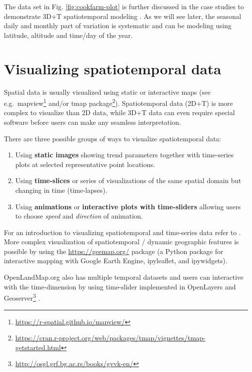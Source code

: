 \documentclass[
  graybox,natbib,nospthms]{svmono}
\providecommand{\tightlist}{%
  \setlength{\itemsep}{0pt}\setlength{\parskip}{0pt}}
\providecommand{\tightlist}{\setlength{\itemsep}{0pt}\setlength{\parskip}{0pt}}
\renewcommand{\href}[2]{#2 (\url{#1})}
\renewcommand{\href}[2]{#2\footnote{\url{#1}}}
\begin{document}
The data set in Fig. \ref{fig:cookfarm-plot} is further discussed in the case
studies to demonstrate 3D+T spatiotemporal modeling \citep{gasch2015spatio}.
As we will see later, the seasonal daily and monthly part of variation
is systematic and can be modeling using latitude, altitude and time/day of the year.

\hypertarget{visualizing-spatiotemporal-data}{%
\section{Visualizing spatiotemporal data}\label{visualizing-spatiotemporal-data}}

Spatial data is usually visualized using static or interactive maps (see e.g.~\href{https://r-spatial.github.io/mapview/}{mapview} and/or \href{https://cran.r-project.org/web/packages/tmap/vignettes/tmap-getstarted.html}{tmap package}).
Spatiotemporal data (2D+T) is more complex to visualize than 2D data, while 3D+T data
can even require special software \citep{hengl2015plotkml} before
users can make any seamless interpretation.

There are three possible groups of ways to visualize spatiotemporal
data:

\begin{enumerate}
\def\labelenumi{\arabic{enumi}.}
\tightlist
\item
  Using \textbf{static images} showing trend parameters together with
  time-series plots at selected representative point locations.\\
\item
  Using \textbf{time-slices} or series of visualizations of the same
  spatial domain but changing in time (time-lapses).\\
\item
  Using \textbf{animations} or \textbf{interactive plots with time-sliders}
  allowing users to choose \emph{speed} and \emph{direction} of animation.
\end{enumerate}

For an introduction to visualizing spatiotemporal and time-series data
refer to \citet{lamigueiro2014displaying}. More complex visualization of
spatiotemporal / dynamic geographic features is possible by using the
\url{https://geemap.org/} package (a Python package for interactive mapping with Google Earth Engine, ipyleaflet, and ipywidgets).

OpenLandMap.org also has multiple temporal datasets and users can interactive with
the time-dimension by using time-slider implemented in \href{http://osgl.grf.bg.ac.rs/books/gvvk-en/}{OpenLayers and Geoserver} \citep{KilibardaProtic2019}.
\end{document}
